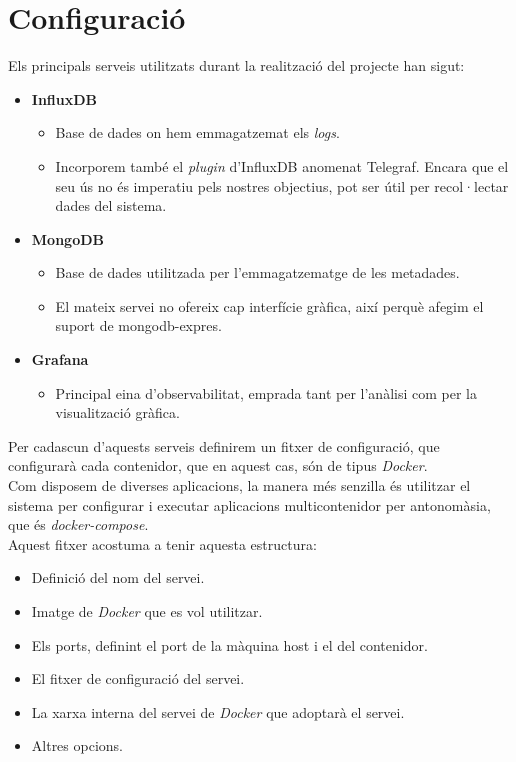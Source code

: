 \clearpage

\section*{Configuració}\label{sec:server-configuration}

Els principals serveis utilitzats durant la realització del projecte han sigut:

\begin{itemize}
    \item \textbf{InfluxDB}
    \begin{itemize}
        \item Base de dades on hem emmagatzemat els \textit{\gls{log}s}.
        \item {
            Incorporem també el \textit{\gls{plugin}} d’InfluxDB anomenat Telegraf.
            Encara que el seu ús no és imperatiu pels nostres objectius, pot ser útil per recol·lectar dades del sistema.
        }
    \end{itemize}
    \item \textbf{MongoDB}
    \begin{itemize}
        \item Base de dades utilitzada per l’emmagatzematge de les metadades.
        \item El mateix servei no ofereix cap interfície gràfica, així perquè afegim el suport de mongodb-expres.
    \end{itemize}
    \item \textbf{Grafana}
    \begin{itemize}
        \item Principal eina d’observabilitat, emprada tant per l’anàlisi com per la visualització gràfica.
    \end{itemize}
\end{itemize}

\noindent
Per cadascun d’aquests serveis definirem un fitxer de configuració, que configurarà cada contenidor, que en aquest cas, són de tipus \textit{\gls{Docker}}. \\

\noindent
Com disposem de diverses aplicacions, la manera més senzilla és utilitzar el sistema per configurar i executar aplicacions multicontenidor per antonomàsia, que és \textit{\gls{docker-compose}}. \\

\noindent
Aquest fitxer acostuma a tenir aquesta estructura:

\begin{itemize}
    \item Definició del nom del servei.
    \item Imatge de \textit{\gls{Docker}} que es vol utilitzar.
    \item Els ports, definint el port de la màquina host i el del contenidor.
    \item El fitxer de configuració del servei.
    \item La xarxa interna del servei de \textit{\gls{Docker}} que adoptarà el servei.
    \item Altres opcions.
\end{itemize}

